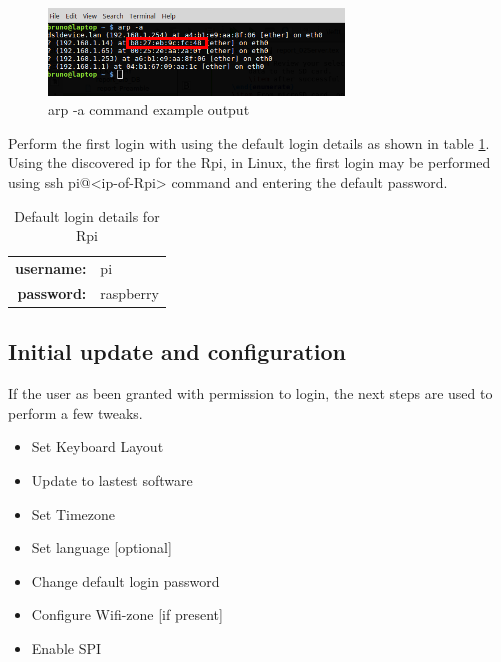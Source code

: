 \begin{figure}[hb]
	\centering
	\includegraphics[width=0.7\textwidth]{figures/arp_example}
	\caption{arp -a command example output}
	\label{arp_example}
\end{figure}

Perform the first login with using the default login details as shown in table \ref{tab:default_login}.
Using the discovered ip for the \gls{Rpi}, in Linux, the first login  may be performed using \colorbox{gray!15}{ssh pi@\textless ip-of-Rpi\textgreater} command and entering the default password.
\begin{table}[h]
	\centering
	\begin{tabular}{rl}
		\toprule
		\textbf{username:}& pi\\
		\textbf{password:}& raspberry\\
		\bottomrule
	\end{tabular}
	\caption{Default login details for \gls{Rpi}}
	\label{tab:default_login}
\end{table}

\subsection{Initial update and configuration}
If the user as been granted with permission to login, the next steps are used to perform a few tweaks.
\begin{itemize}
	\item Set Keyboard Layout
	\item Update to lastest software
	\item Set Timezone
	\item Set language [optional]
	\item Change default login password
	\item Configure Wifi-zone [if present]
	\item Enable \gls{SPI}
\end{itemize}


